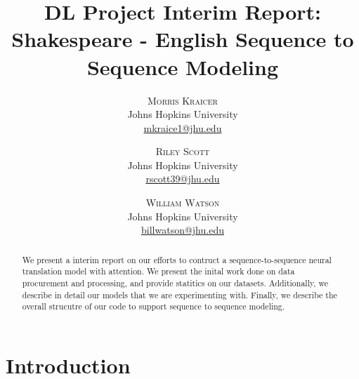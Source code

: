 \documentclass[twoside,twocolumn]{article}
\title{DL Project Interim Report:\\
       Shakespeare - English Sequence to Sequence Modeling}
\author{%
\textsc{Morris Kraicer} \\[1ex]
\normalsize Johns Hopkins University \\
\normalsize \href{mailto:mkraice1@jhu.edu}{mkraice1@jhu.edu}
 \and
 \textsc{Riley Scott} \\[1ex]
\normalsize Johns Hopkins University \\
\normalsize \href{mailto:rscott39@jhu.edu}{rscott39@jhu.edu}
 \and
  \textsc{William Watson} \\[1ex]
\normalsize Johns Hopkins University \\
\normalsize \href{mailto:billwatson@jhu.edu}{billwatson@jhu.edu}
}
\date{}%
\begin{document}
\maketitle













\begin{abstract}
\noindent
We present a interim report on our efforts to contruct a sequence-to-sequence
neural translation model with attention. We present the inital work done on
data procurement and processing, and provide statitics on our datasets.
Additionally, we describe in detail our models that we are experimenting with.
Finally, we describe the overall strucutre of our code to support sequence
to sequence modeling.
\end{abstract}

\section{Introduction}
\end{document}
